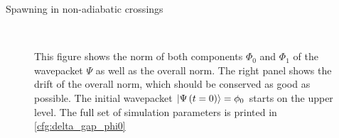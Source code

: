 \begin{chapter}{Spawning in non-adiabatic crossings}
\begin{figure}[h!]
  \centering
   \\
  \caption[Norms and norm drift for a $\phi_0$ in an avoided crossing]{
  This figure shows the norm of both components $\Phi_0$ and $\Phi_1$ of the
  wavepacket $\Psi$ as well as the overall norm. The right panel shows the drift
  of the overall norm, which should be conserved as good as possible.
  The initial wavepacket $\Ket{\Psi\left( t=0 \right)} = \phi_0$ starts on the upper level.
  The full set of simulation parameters is printed in \ref{cfg:delta_gap_phi0}
  \label{fig:basic_delta_gap_phi0_norms}
  }
\end{figure}



\end{chapter}
